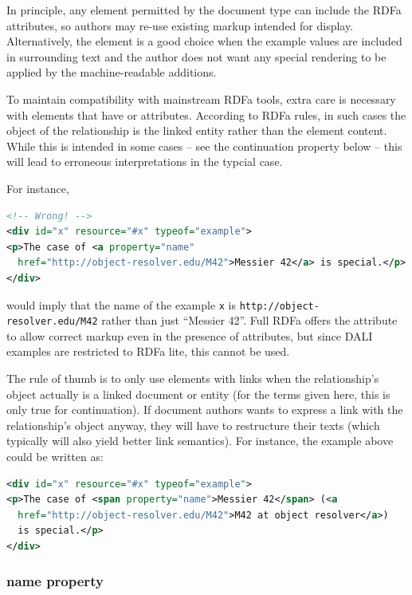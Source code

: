 \documentclass[11pt,letter]{ivoa}
\begin{document}
In principle, any element permitted by the document type can include the RDFa 
attributes, so authors may re-use existing markup intended for display. 
Alternatively, the  element is a good choice when the example values are 
included in surrounding text and the author does not want any special rendering 
to be applied by the machine-readable additions.

To maintain compatibility with mainstream RDFa tools, extra care is
necessary with elements that have  or 
attributes.  According to RDFa rules, in such cases the object of the
relationship is the linked entity rather than the element content.
While this is intended in some cases -- see the continuation property
below -- this will lead to erroneous interpretations in the typcial
case.

For instance,

\begin{lstlisting}[language=XML]
<!-- Wrong! -->
<div id="x" resource="#x" typeof="example">
<p>The case of <a property="name" 
  href="http://object-resolver.edu/M42">Messier 42</a> is special.</p>
</div>
\end{lstlisting}

would imply that the name of the example \texttt{x} is
\nolinkurl{http://object-resolver.edu/M42} rather than just ``Messier
42''.  Full RDFa offers the  attribute to allow correct
markup even in the presence of  attributes, but since DALI
examples are restricted to RDFa lite, this cannot be used.

The rule of thumb is to only use elements with links when the
relationship's object actually is a linked document or entity (for the
terms given here, this is only true for continuation).  If document
authors wants to express a link with the relationship's object anyway,
they will have to restructure their texts (which typically will also
yield better link semantics).  For instance, the example above could be
written as:

\begin{lstlisting}[language=XML]
<div id="x" resource="#x" typeof="example">
<p>The case of <span property="name">Messier 42</span> (<a
  href="http://object-resolver.edu/M42">M42 at object resolver</a>)
  is special.</p>
</div>
\end{lstlisting}

\subsubsection{name property}
\end{document}
